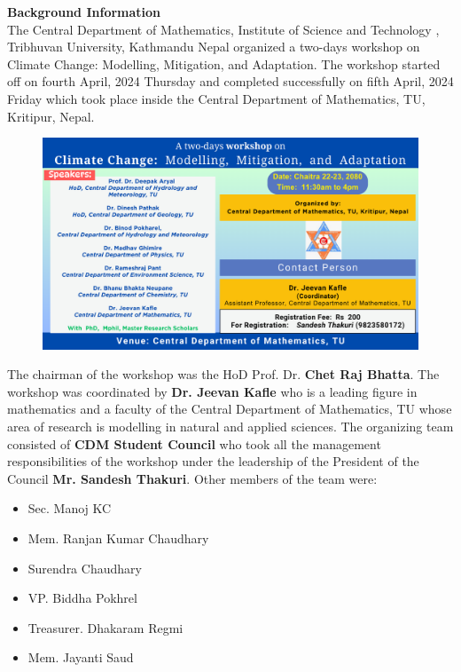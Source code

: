 \documentclass[a4paper,12pt]{report}
\begin{document}
\clearpage
\vspace*{5mm}
{\bfseries \Large Background Information}\\[3mm]
The Central Department of Mathematics, Institute of Science and Technology , Tribhuvan University, Kathmandu Nepal organized a two-days workshop on Climate Change:  Modelling,  Mitigation, and  Adaptation. The workshop started off on fourth April, 2024 Thursday and completed successfully on fifth  April, 2024 Friday which took place inside the Central Department of Mathematics, TU, Kritipur, Nepal.
\vspace{5mm}

\begin{figure}[h!]
  \centering
  \includegraphics[scale=0.33]{workshop_climatechange.png}
\end{figure}
\vspace{5mm}
\noindent
The chairman of the workshop was the HoD Prof. Dr. \textbf{Chet Raj Bhatta}. The workshop was coordinated by \textbf{Dr. Jeevan Kafle} who is a leading figure in mathematics and a faculty of the Central Department of Mathematics, TU whose area of research is modelling in natural and applied sciences. The organizing team consisted of \textbf{CDM Student Council} who took all the management responsibilities of the workshop under the leadership of the President of the Council \textbf{Mr. Sandesh Thakuri}. Other members of the team were:
\vspace{10mm}

\begin{minipage}{0.45\textwidth}
 \begin{itemize}
\item Sec. Manoj KC
\item Mem. Ranjan Kumar Chaudhary
\item Surendra Chaudhary
\end{itemize}
\end{minipage}\hspace{3mm}
\begin{minipage}{0.45\textwidth}
\begin{itemize}
\item VP. Biddha Pokhrel
\item Treasurer. Dhakaram Regmi
\item Mem. Jayanti Saud
\end{itemize}
\end{minipage}
\end{document}

